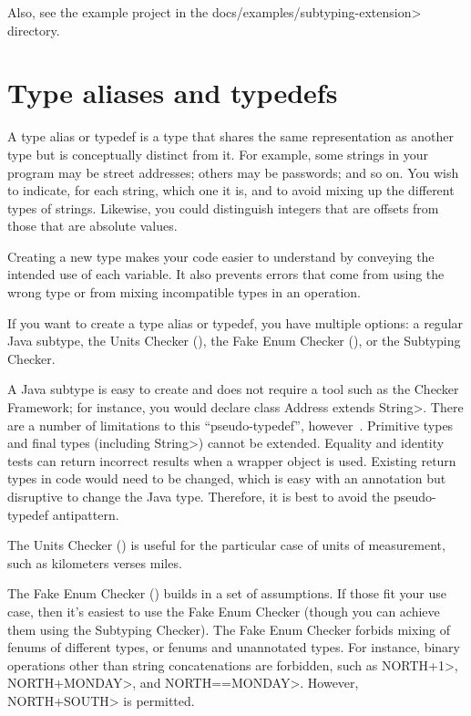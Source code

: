 Also, see the example project in the \<docs/examples/subtyping-extension> directory.


\section{Type aliases and typedefs\label{subtyping-type-alias}}

A type alias or typedef is a type that shares the same representation as
another type but is conceptually distinct from it.  For example, some
strings in your program may be street addresses; others may be passwords;
and so on.  You wish to indicate, for each string, which one it is, and to
avoid mixing up the different types of strings.  Likewise, you could
distinguish integers that are offsets from those that are absolute values.

Creating a new type makes your code easier to understand by conveying the
intended use of each variable.  It also prevents errors that come from
using the wrong type or from mixing incompatible types in an operation.

If you want to create a type alias or typedef, you have multiple options:
a regular Java subtype,
the Units Checker (),
the Fake Enum Checker (), or
the Subtyping Checker.

A Java subtype is easy to create and does not require a tool such as the
Checker Framework; for instance, you would declare \<class Address extends
String>.  There are a number of limitations to this ``pseudo-typedef'',
however~\cite{Goetz2006:typedef}.
Primitive types and final types (including \<String>) cannot be extended.
Equality and identity tests can return incorrect results when a wrapper
object is used.  Existing return types in code would need to be changed,
which is easy with an annotation but disruptive to change the Java type.
Therefore, it is best to avoid the pseudo-typedef antipattern.

The Units Checker () is useful for the
particular case of units of measurement, such as kilometers verses miles.

The Fake Enum Checker ()
builds in a set of assumptions.  If those fit your
use case, then it's easiest to use the Fake Enum Checker (though you can
achieve them using the Subtyping Checker).  The Fake Enum Checker forbids
mixing of fenums of different types, or fenums and unannotated types.  For
instance, binary operations other than string concatenations are forbidden,
such as \<NORTH+1>, \<NORTH+MONDAY>, and \<NORTH==MONDAY>.  However,
\<NORTH+SOUTH> is permitted.

